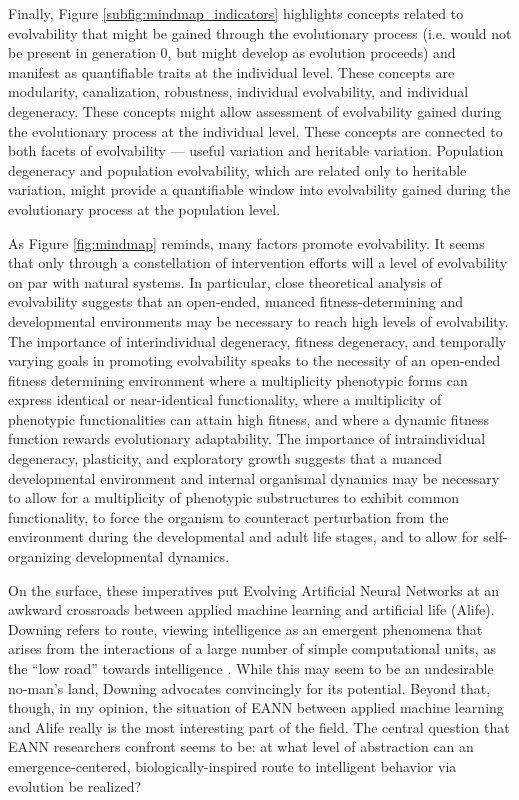 Finally, Figure \ref{subfig:mindmap_indicators} highlights concepts related to evolvability that might be gained through the evolutionary process (i.e. would not be present in generation 0, but might develop as evolution proceeds) and manifest as quantifiable traits at the individual level. These concepts are modularity, canalization, robustness, individual evolvability, and individual degeneracy. These concepts might allow assessment of evolvability gained during the evolutionary process at the individual level. These concepts are connected to both facets of evolvability --- useful variation and heritable variation. Population degeneracy and population evolvability, which are related only to heritable variation, might provide a quantifiable window into evolvability gained during the evolutionary process at the population level.

As Figure \ref{fig:mindmap} reminds, many factors promote evolvability. It seems that only through a constellation of intervention efforts will a level of evolvability on par with natural systems. In particular, close theoretical analysis of evolvability suggests that an  open-ended, nuanced fitness-determining and developmental environments may be necessary to reach high levels of evolvability. The importance of interindividual degeneracy, fitness degeneracy, and temporally varying goals in promoting evolvability speaks to the necessity of an open-ended fitness determining environment where a multiplicity phenotypic forms can express identical or near-identical functionality, where a multiplicity of phenotypic functionalities can attain high fitness, and where a dynamic fitness function rewards evolutionary adaptability. The importance of intraindividual degeneracy, plasticity, and exploratory growth suggests that a nuanced developmental environment and internal organismal dynamics may be necessary to allow for a multiplicity of phenotypic substructures to exhibit common functionality, to force the organism to counteract perturbation from the environment during the developmental and adult life stages, and to allow for self-organizing developmental dynamics.

On the surface, these imperatives put Evolving Artificial Neural Networks at an awkward crossroads between applied machine learning and artificial life (Alife). Downing refers to route, viewing intelligence as an emergent phenomena that arises from the interactions of a large number of simple computational units, as the ``low road'' towards intelligence \cite[pg 19]{Downing2015IntelligenceSystems}.  While this may seem to be an undesirable no-man's land, Downing advocates convincingly for its potential. Beyond that, though, in my opinion, the situation of EANN between applied machine learning and Alife really is the most interesting part of the field. The central question that EANN researchers confront seems to be: at what level of abstraction can an emergence-centered, biologically-inspired route to intelligent behavior via evolution be realized? 

